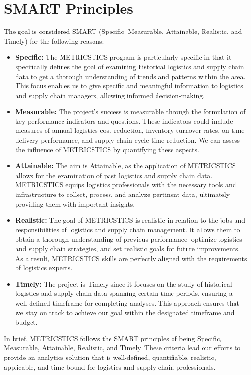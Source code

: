 \section{SMART Principles}
The goal is considered SMART (Specific, Measurable, Attainable, Realistic, and Timely) for the following reasons:
\begin{itemize}
	\item \textbf{Specific:} The METRICSTICS program is particularly specific in that it specifically defines the goal of examining historical logistics and supply chain data to get a thorough understanding of trends and patterns within the area. This focus enables us to give specific and meaningful information to logistics and supply chain managers, allowing informed decision-making.
	
	\item \textbf{Measurable:} The project's success is measurable through the formulation of key performance indicators and questions. These indicators could include measures of annual logistics cost reduction, inventory turnover rates, on-time delivery performance, and supply chain cycle time reduction. We can assess the influence of METRICSTICS by quantifying these aspects.
	
	\item \textbf{Attainable:} The aim is Attainable, as the application of METRICSTICS allows for the examination of past logistics and supply chain data. METRICSTICS equips logistics professionals with the necessary tools and infrastructure to collect, process, and analyze pertinent data, ultimately providing them with important insights.
	
	\item \textbf{Realistic:} The goal of METRICSTICS is realistic in relation to the jobs and responsibilities of logistics and supply chain management. It allows them to obtain a thorough understanding of previous performance, optimize logistics and supply chain strategies, and set realistic goals for future improvements. As a result, METRICSTICS skills are perfectly aligned with the requirements of logistics experts.
	
	\item \textbf{Timely:} The project is Timely since it focuses on the study of historical logistics and supply chain data spanning certain time periods, ensuring a well-defined timeframe for completing analyses. This approach ensures that we stay on track to achieve our goal within the designated timeframe and budget.
\end{itemize}
In brief, METRICSTICS follows the SMART principles of being Specific, Measurable, Attainable, Realistic, and Timely. These criteria lead our efforts to provide an analytics solution that is well-defined, quantifiable, realistic, applicable, and time-bound for logistics and supply chain professionals.

